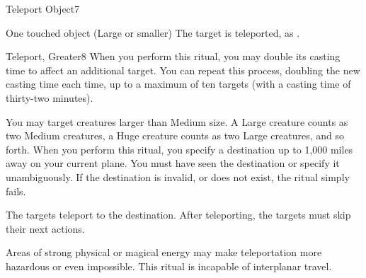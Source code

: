 \begin{spellsection}{Teleport Object}{7}
\begin{spelltarget}{One touched object (Large or smaller)}
    The target is teleported, as .
\end{spelltarget}
\end{spellsection}

\begin{spellsection}{Teleport, Greater}{8}
\spellspecial When you perform this ritual, you may double its casting time to affect an additional target. You can repeat this process, doubling the new casting time each time, up to a maximum of ten targets (with a casting time of thirty-two minutes).

You may target creatures larger than Medium size. A Large creature counts as two Medium creatures, a Huge creature counts as two Large creatures, and so forth.
\spelleffect When you perform this ritual, you specify a destination up to 1,000 miles away on your current plane. You must have seen the destination or specify it unambiguously. If the destination is invalid, or does not exist, the ritual simply fails.

The targets teleport to the destination. After teleporting, the targets must skip their next actions.

\spellnotes Areas of strong physical or magical energy may make teleportation more hazardous or even impossible. This ritual is incapable of interplanar travel.
\end{spellsection}

